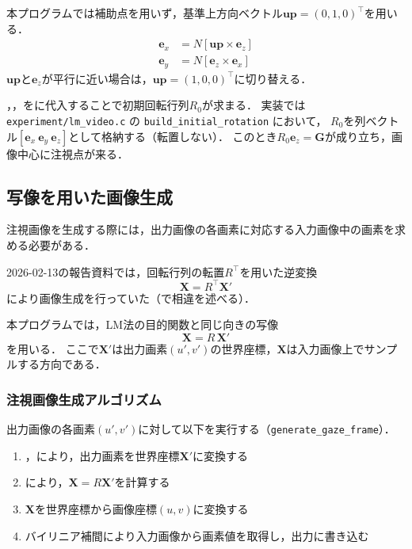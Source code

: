 \documentclass{ltjsarticle}          %
\begin{document}
本プログラムでは補助点を用いず，基準上方向ベクトル$\bm{up} = (0, 1, 0)^\top$を用いる．
\begin{align}
  \bm{e}_x &= N[\bm{up} \times \bm{e}_z]
  \label{eq:ex_impl} \\
  \bm{e}_y &= N[\bm{e}_z \times \bm{e}_x]
  \label{eq:ey_impl}
\end{align}
$\bm{up}$と$\bm{e}_z$が平行に近い場合は，$\bm{up} = (1, 0, 0)^\top$に切り替える．

，，をに代入することで初期回転行列$R_0$が求まる．
実装では \texttt{experiment/lm\_video.c} の \texttt{build\_initial\_rotation} において，
$R_0$を列ベクトル$[\bm{e}_x\ \bm{e}_y\ \bm{e}_z]$として格納する（転置しない）．
このとき$R_0\bm{e}_z = \bm{G}$が成り立ち，画像中心に注視点が来る．

\subsection{写像を用いた画像生成}
注視画像を生成する際には，出力画像の各画素に対応する入力画像中の画素を求める必要がある．

2026-02-13の報告資料では，回転行列の転置$R^\top$を用いた逆変換
\begin{equation}
  \bm{X} = R^\top \bm{X}'
  \label{eq:inverse_transform_paper}
\end{equation}
により画像生成を行っていた（で相違を述べる）．

本プログラムでは，LM法の目的関数と同じ向きの写像
\begin{equation}
  \bm{X} = R\,\bm{X}'
  \label{eq:forward_render}
\end{equation}
を用いる．
ここで$\bm{X}'$は出力画素$(u', v')$の世界座標，$\bm{X}$は入力画像上でサンプルする方向である．

\subsubsection{注視画像生成アルゴリズム}
出力画像の各画素$(u', v')$に対して以下を実行する（\texttt{generate\_gaze\_frame}）．
\begin{enumerate}
  \item {}，により，出力画素を世界座標$\bm{X}'$に変換する
  \item {}により，$\bm{X} = R\bm{X}'$を計算する
  \item $\bm{X}$を世界座標から画像座標$(u, v)$に変換する
  \item バイリニア補間により入力画像から画素値を取得し，出力に書き込む
\end{enumerate}
\end{document}
